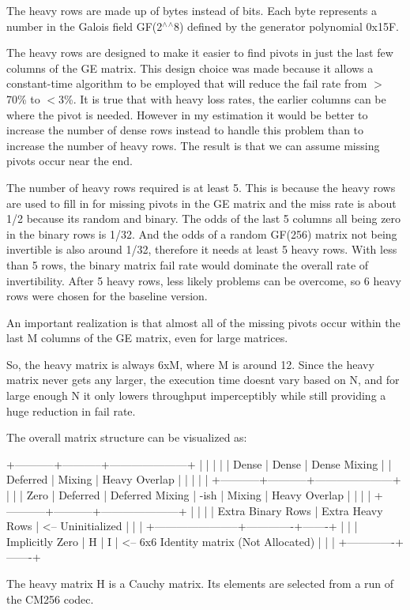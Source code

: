 The heavy rows are made up of bytes instead of bits. Each byte represents a number in the Galois field G\+F(2$^\wedge$$^\wedge$8) defined by the generator polynomial 0x15F.

The heavy rows are designed to make it easier to find pivots in just the last few columns of the GE matrix. This design choice was made because it allows a constant-\/time algorithm to be employed that will reduce the fail rate from $>$70\% to $<$3\%. It is true that with heavy loss rates, the earlier columns can be where the pivot is needed. However in my estimation it would be better to increase the number of dense rows instead to handle this problem than to increase the number of heavy rows. The result is that we can assume missing pivots occur near the end.

The number of heavy rows required is at least 5. This is because the heavy rows are used to fill in for missing pivots in the GE matrix and the miss rate is about 1/2 because it\textquotesingle{}s random and binary. The odds of the last 5 columns all being zero in the binary rows is 1/32. And the odds of a random G\+F(256) matrix not being invertible is also around 1/32, therefore it needs at least 5 heavy rows. With less than 5 rows, the binary matrix fail rate would dominate the overall rate of invertibility. After 5 heavy rows, less likely problems can be overcome, so 6 heavy rows were chosen for the baseline version.

An important realization is that almost all of the missing pivots occur within the last M columns of the GE matrix, even for large matrices.

So, the heavy matrix is always 6xM, where M is around 12. Since the heavy matrix never gets any larger, the execution time doesn\textquotesingle{}t vary based on N, and for large enough N it only lowers throughput imperceptibly while still providing a huge reduction in fail rate. \begin{DoxyVerb}The overall matrix structure can be visualized as:

+-----------+-----------+---------------------+
|           |           |                     |
|  Dense    |  Dense    |    Dense Mixing     |
|  Deferred |  Mixing   |    Heavy Overlap    |
|           |           |                     |
+-----------+-----------+---------------------+
            |           |                     |
    Zero    |  Deferred |    Deferred Mixing  |
    -ish    |  Mixing   |    Heavy Overlap    |
            |           |                     |
+-----------+-----------+---------------------+
|                       |                     |
|   Extra Binary Rows   |   Extra Heavy Rows  | <-- Uninitialized
|                       |                     |
+-----------------------+-------------+-------+
                        |             |       |
    Implicitly Zero     |      H      |   I   | <-- 6x6 Identity matrix
    (Not Allocated)     |             |       |
                        +-------------+-------+

The heavy matrix H is a Cauchy matrix.  Its elements are selected
from a run of the CM256 codec.
\end{DoxyVerb}
 